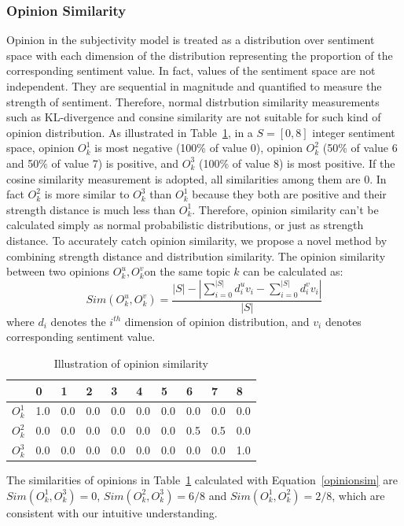 \documentclass[letterpaper]{article}
\begin{document}
\subsubsection{Opinion Similarity}
\label{opsim}

Opinion in the subjectivity model is treated  as a distribution over sentiment space with each dimension of the distribution representing the proportion of the corresponding sentiment value. 
In fact, values of the sentiment space are not independent. 
They are sequential in magnitude and quantified to measure the strength of sentiment. Therefore, normal distrbution similarity measurements such as KL-divergence and consine similarity are not suitable for such kind of opinion distribution. As illustrated in Table~\ref{tab1}, in a $ S=[0,8 ] $ integer sentiment space, opinion $ O_{k}^{1} $ is most negative (100\% of value 0), opinion $ O_{k}^{2} $ (50\% of value 6 and 50\% of value 7) is positive, and $ O_{k}^{3} $ (100\% of value 8) is most positive.
If the cosine similarity measurement is adopted, all similarities among them are 0.
In fact $ O_{k}^{2} $ is more similar to $ O_{k}^{3} $ than $O_{k}^{1} $ because they both are positive and their strength distance is much less than $ O_{k}^{1} $.  
Therefore, opinion similarity can't be calculated simply as normal probabilistic distributions, or just as strength distance. 
To accurately catch opinion similarity, we propose a novel method by combining strength distance and distribution similarity.
The opinion similarity between two opinions $O_{k}^{u},O_{k}^{v} $on the same topic $ k $ can be calculated as: 
\begin{equation}
\label{opinionsim}
Sim(O_{k}^{u},O_{k}^{v})=\dfrac{|S|-|\sum_{i=0}^{|S|}d_{i}^{u}v_{i}-\sum_{i=0}^{|S|}d_{i}^{v}v_{i}|}{|S|}
\end{equation}
where $ d_{i} $ denotes the $ i^{th} $ dimension of opinion distribution, and $ v_{i} $ denotes corresponding sentiment value. 
\begin{table}[htb]
\scriptsize
\centering
\caption{Illustration of opinion similarity}
\label{tab1}
\begin{tabular}{|l|l|l|l|l|l|l|l|l|l|}
\hline
 & 0 & 1& 2 & 3 & 4 & 5 & 6 & 7 & 8 \\
\hline
$O_{k}^{1}$ & 1.0 & 0.0 & 0.0 & 0.0 & 0.0 & 0.0 & 0.0 & 0.0 & 0.0 \\
\hline
$O_{k}^{2}$ & 0.0 & 0.0 & 0.0 & 0.0 & 0.0 & 0.0 & 0.5 & 0.5 & 0.0 \\
\hline
$O_{k}^{3}$ & 0.0 & 0.0 & 0.0 & 0.0 & 0.0 & 0.0 & 0.0 & 0.0 & 1.0 \\
\hline
\end{tabular}
\end{table} 
The similarities of opinions in Table~\ref{tab1} calculated with Equation~\ref{opinionsim} are $ Sim(O_{k}^{1},O_{k}^{3})=0 $, $ Sim(O_{k}^{2},O_{k}^{3})=6/8 $ and $ Sim(O_{k}^{1},O_{k}^{2})=2/8 $, which are consistent with our intuitive understanding. 
\end{document}
